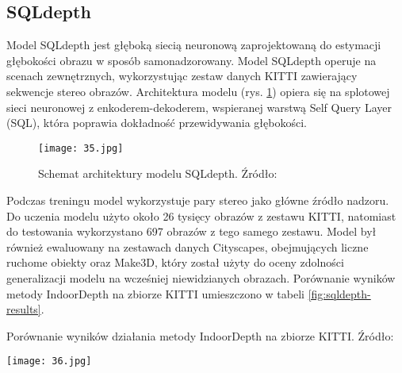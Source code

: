 \subsection{SQLdepth}
Model SQLdepth \cite{wang2023sqldepth} jest głęboką siecią neuronową zaprojektowaną do estymacji głębokości obrazu w sposób samonadzorowany. Model SQLdepth operuje na scenach zewnętrznych, wykorzystując zestaw danych KITTI zawierający sekwencje stereo obrazów. Architektura modelu (rys. \ref{fig:sqldepth-architecture}) opiera się na splotowej sieci neuronowej z enkoderem-dekoderem, wspieranej warstwą Self Query Layer (SQL), która poprawia dokładność przewidywania głębokości.
\begin{figure}[H]
    \centering
    \texttt{[image: 35.jpg]}
    \caption{Schemat architektury modelu SQLdepth. Źródło: \cite{wang2023sqldepth}}
    \label{fig:sqldepth-architecture}
\end{figure}
Podczas treningu model wykorzystuje pary stereo jako główne źródło nadzoru. Do uczenia modelu użyto około 26 tysięcy obrazów z zestawu KITTI, natomiast do testowania wykorzystano 697 obrazów z tego samego zestawu. Model był również ewaluowany na zestawach danych Cityscapes, obejmujących liczne ruchome obiekty oraz Make3D, który został użyty do oceny zdolności generalizacji modelu na wcześniej niewidzianych obrazach. Porównanie wyników metody IndoorDepth na zbiorze KITTI umieszczono w tabeli \ref{fig:sqldepth-results}.
\begin{table}[H]
    \centering
    \caption{Porównanie wyników działania metody IndoorDepth na zbiorze KITTI. Źródło: \cite{wang2023sqldepth}}
    \texttt{[image: 36.jpg]}
    \label{fig:sqldepth-results}
\end{table}


